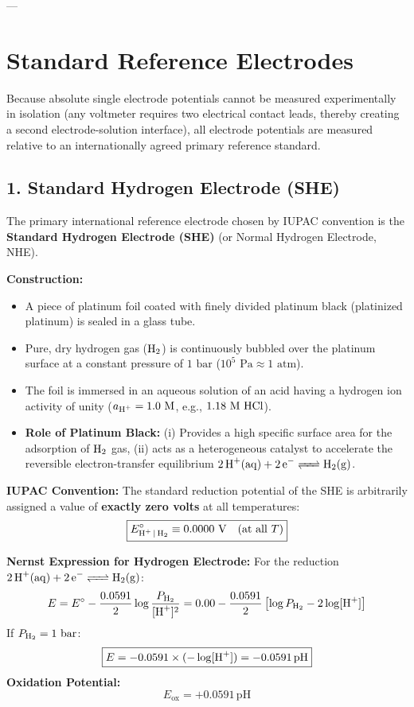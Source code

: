 ---

\section{Standard Reference Electrodes}

Because absolute single electrode potentials cannot be measured experimentally in isolation (any voltmeter requires two electrical contact leads, thereby creating a second electrode-solution interface), all electrode potentials are measured relative to an internationally agreed primary reference standard.

\subsection{1. Standard Hydrogen Electrode (SHE)}
The primary international reference electrode chosen by IUPAC convention is the \textbf{Standard Hydrogen Electrode (SHE)} (or Normal Hydrogen Electrode, NHE).

\textbf{Construction:}
\begin{itemize}[leftmargin=*]
    \item A piece of platinum foil coated with finely divided platinum black (platinized platinum) is sealed in a glass tube.
    \item Pure, dry hydrogen gas ($\ce{H2}$) is continuously bubbled over the platinum surface at a constant pressure of $1\text{ bar}$ ($10^5\text{ Pa} \approx 1\text{ atm}$).
    \item The foil is immersed in an aqueous solution of an acid having a hydrogen ion activity of unity ($a_{\ce{H+}} = 1.0\text{ M}$, e.g., $1.18\text{ M } \ce{HCl}$).
    \item \textbf{Role of Platinum Black:} (i) Provides a high specific surface area for the adsorption of $\ce{H2}$ gas, (ii) acts as a heterogeneous catalyst to accelerate the reversible electron-transfer equilibrium $\ce{2H+(aq) + 2e^- <=> H2(g)}$.
\end{itemize}

\textbf{IUPAC Convention:}
The standard reduction potential of the SHE is arbitrarily assigned a value of \textbf{exactly zero volts} at all temperatures:
\begin{equation}
    \boxed{E^\circ_{\ce{H+ | H2}} \equiv 0.0000\text{ V} \quad (\text{at all } T)}
\end{equation}

\textbf{Nernst Expression for Hydrogen Electrode:}
For the reduction $\ce{2H+(aq) + 2e^- <=> H2(g)}$:
\begin{equation}
    E = E^\circ - \frac{0.0591}{2} \log \frac{P_{\ce{H2}}}{[\ce{H+}]^2} = 0.00 - \frac{0.0591}{2} \left[ \log P_{\ce{H2}} - 2 \log [\ce{H+}] \right]
\end{equation}
If $P_{\ce{H2}} = 1\text{ bar}$:
\begin{equation}
    \boxed{E = -0.0591 \times (-\log [\ce{H+}]) = -0.0591\,\text{pH}}
\end{equation}
\textbf{Oxidation Potential:}
\begin{equation}
    E_{\text{ox}} = +0.0591\,\text{pH}
\end{equation}

